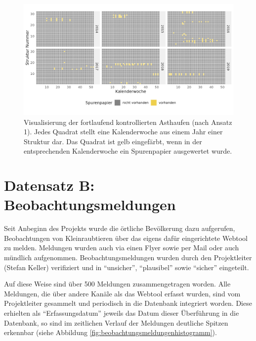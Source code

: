 \documentclass[
  oneside]{scrbook}
\begin{document}
\begin{figure}
\includegraphics[width=1\linewidth]{images/wirkungskontrolle_spontan_effort} \caption{Visualisierung der fortlaufend kontrollierten Asthaufen (nach Ansatz 1). Jedes Quadrat stellt eine Kalenderwoche aus einem Jahr einer Struktur dar. Das Quadrat ist gelb eingefärbt, wenn in der entsprechenden Kalenderwoche ein Spurenpapier ausgewertet wurde.}\label{fig:wirkungskontrollespontaneffort}
\end{figure}

\hypertarget{methode-datensatz-b}{%
\section{Datensatz B: Beobachtungsmeldungen}\label{methode-datensatz-b}}

Seit Anbeginn des Projekts wurde die örtliche Bevölkerung dazu aufgerufen, Beobachtungen von Kleinraubtieren über das eigens dafür eingerichtete Webtool zu melden. Meldungen wurden auch via einen Flyer sowie per Mail oder auch mündlich aufgenommen. Beobachtungsmeldungen wurden durch den Projektleiter (Stefan Keller) verifiziert und in ``unsicher'', ``plausibel'' sowie ``sicher'' eingeteilt.

Auf diese Weise sind über 500 Meldungen zusammengetragen worden. Alle Meldungen, die über andere Kanäle als das Webtool erfasst wurden, sind vom Projektleiter gesammelt und periodisch in die Datenbank integriert worden. Diese erhielten als ``Erfassungsdatum'' jeweils das Datum dieser Überführung in die Datenbank, so sind im zeitlichen Verlauf der Meldungen deutliche Spitzen erkennbar (siehe Abbildung \ref{fig:beobachtungsmeldungenhistogramm}).
\end{document}
